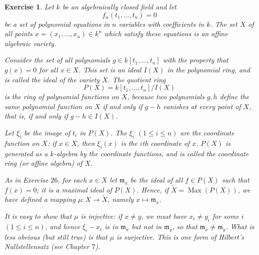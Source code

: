 \documentclass[12pt,letterpaper]{article}
\newtheorem{problem}{Exercise}[section]
\theoremstyle{definition}
\theoremstyle{remark}
\numberwithin{figure}{problem}
\numberwithin{equation}{section}
\DeclareMathOperator{\Max}{Max}
\begin{document}
\begin{problem}
  Let
  $k$ be an algebraically closed field and let
  \begin{equation*}
    f_\alpha(t_1,\ldots,t_n) = 0
  \end{equation*}
  be a set of polynomial equations in
  $n$ variables with coefficients in
  $k$.
  The set
  $X$ of all points
  $x = (x_1,\ldots,x_n) \in
  k^n$ which satisfy these equations is an \emph{affine algebraic variety}.
  \par Consider the set of all polynomials
  $g \in
  k[t_1,\ldots,t_n]$ with the property that
  $g(x) =
  0$ for all
  $x \in
  X$.
  This set is an ideal
  $I(X)$ in the polynomial ring, and is called the \emph{ideal of the variety
    $X$}.
  The quotient ring
  \begin{equation*}
    P(X) = k[t_1,\ldots,t_n]/I(X)
  \end{equation*}
  is the ring of polynomial functions on
  $X$, because two polynomials
  $g,h$ define the same polynomial function on
  $X$ if and only if
  $g -
  h$ vanishes at every point of
  $X$, that is, if and only if
  $g - h \in
  I(X)$.
  \par Let
  $\xi_i$ be the image of
  $t_i$ in
  $P(X)$.
  The
  $\xi_i$ $(1 \le i \le
  n)$ are the \emph{coordinate function} on
  $X$: if
  $x \in
  X$, then
  $\xi_i(x)$ is the
  $i$th coordinate of
  $x$.
  $P(X)$ is generated as a
  $k$-algebra by the coordinate functions, and is called the \emph{coordinate ring} (or affine algebra) of
  $X$.
  \par As in Exercise
  \hyperref[exc:1.26]{$26$}, for each
  $x \in
  X$ let
  $\mathfrak{m}_x$ be the ideal of all
  $f \in
  P(X)$ such that
  $f(x) =
  0$; it is a maximal ideal of
  $P(X)$.
  Hence, if
  $\tilde{X} =
  \Max(P(X))$, we have defined a mapping
  $\mu \colon X \to
  \tilde{X}$, namely
  $x \mapsto
  \mathfrak{m}_x$.
  \par It is easy to show that
  $\mu$ is injective: if
  $x \ne
  y$, we must have
  $x_i \ne
  y_i$ for some
  $i$ $(1 \le i \le
  n)$, and hence
  $\xi_i -
  x_i$ is in
  $\mathfrak{m}_x$ but not in
  $\mathfrak{m}_y$, so that
  $\mathfrak{m}_x \ne
  \mathfrak{m}_y$.
  What is less obvious (but still true) is that
  $\mu$ is \emph{surjective}.
  This is one form of Hilbert's Nullstellensatz (see Chapter $7$).
\end{problem}
\end{document}
